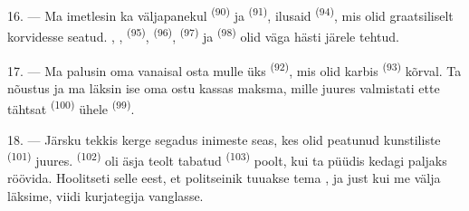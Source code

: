 16. --- Ma imetlesin ka väljapanekul  \textsuperscript{(90)} ja
 \textsuperscript{(91)}, ilusaid 
\textsuperscript{(94)}, mis olid graatsiliselt korvidesse seatud. ,
,  \textsuperscript{(95)}, 
\textsuperscript{(96)},  \textsuperscript{(97)} ja
 \textsuperscript{(98)} olid väga hästi järele tehtud.

\VUsaut{4.4mm}
\VUsaut{2.8mm}

17. --- Ma palusin oma vanaisal osta mulle üks 
\textsuperscript{(92)}, mis olid karbis  \textsuperscript{(93)}
kõrval. Ta nõustus ja ma läksin ise oma ostu kassas maksma, mille juures valmistati
ette tähtsat  \textsuperscript{(100)} ühele 
\textsuperscript{(99)}.

18. --- Järsku tekkis kerge segadus inimeste seas, kes olid peatunud kunstiliste
 \textsuperscript{(101)} juures. 
\textsuperscript{(102)} oli äsja teolt tabatud  \textsuperscript{(103)}
poolt, kui ta püüdis kedagi paljaks röövida. Hoolitseti selle eest, et politseinik
tuuakse tema , ja just kui me välja läksime, viidi kurjategija
vanglasse.

\VUsaut{6.0mm}
\VUfilet{22mm}

